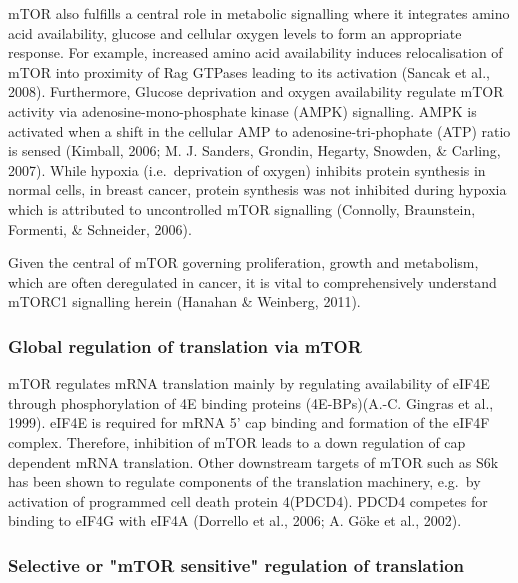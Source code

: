 \documentclass[12pt,openany]{book}
\begin{document}
mTOR also fulfills a central role in metabolic signalling where it
integrates amino acid availability, glucose and cellular oxygen levels
to form an appropriate response. For example, increased amino acid
availability induces relocalisation of mTOR into proximity of Rag
GTPases leading to its activation (Sancak et al., 2008). Furthermore,
Glucose deprivation and oxygen availability regulate mTOR activity via
adenosine-mono-phosphate kinase (AMPK) signalling. AMPK is activated
when a shift in the cellular AMP to adenosine-tri-phophate (ATP) ratio
is sensed (Kimball, 2006; M. J. Sanders, Grondin, Hegarty, Snowden, \&
Carling, 2007). While hypoxia (i.e.~deprivation of oxygen) inhibits
protein synthesis in normal cells, in breast cancer, protein synthesis
was not inhibited during hypoxia which is attributed to uncontrolled
mTOR signalling (Connolly, Braunstein, Formenti, \& Schneider, 2006).

Given the central of mTOR governing proliferation, growth and
metabolism, which are often deregulated in cancer, it is vital to
comprehensively understand mTORC1 signalling herein (Hanahan \&
Weinberg, 2011).

\subsubsection{Global regulation of translation via mTOR}

mTOR regulates mRNA translation mainly by regulating availability of
eIF4E through phosphorylation of 4E binding proteins (4E-BPs)(A.-C.
Gingras et al., 1999). eIF4E is required for mRNA 5' cap binding and
formation of the eIF4F complex. Therefore, inhibition of mTOR leads to a
down regulation of cap dependent mRNA translation. Other downstream
targets of mTOR such as S6k has been shown to regulate components of the
translation machinery, e.g.~by activation of programmed cell death
protein 4(PDCD4). PDCD4 competes for binding to eIF4G with eIF4A
(Dorrello et al., 2006; A. Göke et al., 2002).

\subsubsection{Selective or "mTOR sensitive" regulation of translation}
\end{document}
